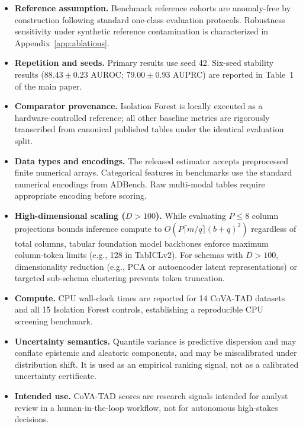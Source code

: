 \documentclass{article}
\begin{document}
\begin{itemize}
  \item \textbf{Reference assumption.} Benchmark reference cohorts are anomaly-free by construction following standard one-class evaluation protocols. Robustness sensitivity under synthetic reference contamination is characterized in Appendix~\ref{app:ablations}.
  \item \textbf{Repetition and seeds.} Primary results use seed 42. Six-seed stability results ($88.43 \pm 0.23$ AUROC; $79.00 \pm 0.93$ AUPRC) are reported in Table~1 of the main paper.
  \item \textbf{Comparator provenance.} Isolation Forest is locally executed as a hardware-controlled reference; all other baseline metrics are rigorously transcribed from canonical published tables under the identical evaluation split.
  \item \textbf{Data types and encodings.} The released estimator accepts preprocessed finite numerical arrays. Categorical features in benchmarks use the standard numerical encodings from ADBench. Raw multi-modal tables require appropriate encoding before scoring.
  \item \textbf{High-dimensional scaling ($D > 100$).} While evaluating $P \le 8$ column projections bounds inference compute to $O(P \lceil m/q \rceil (b+q)^2)$ regardless of total columns, tabular foundation model backbones enforce maximum column-token limits (e.g., 128 in TabICLv2). For schemas with $D > 100$, dimensionality reduction (e.g., PCA or autoencoder latent representations) or targeted sub-schema clustering prevents token truncation.
  \item \textbf{Compute.} CPU wall-clock times are reported for 14 CoVA-TAD datasets and all 15 Isolation Forest controls, establishing a reproducible CPU screening benchmark.
  \item \textbf{Uncertainty semantics.} Quantile variance is predictive dispersion and may conflate epistemic and aleatoric components, and may be miscalibrated under distribution shift. It is used as an empirical ranking signal, not as a calibrated uncertainty certificate.
  \item \textbf{Intended use.} CoVA-TAD scores are research signals intended for analyst review in a human-in-the-loop workflow, not for autonomous high-stakes decisions.
\end{itemize}
\end{document}

